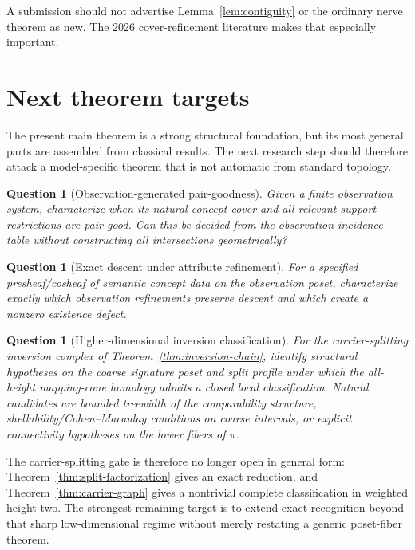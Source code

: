 \documentclass[11pt]{article}
\newtheorem{question}[theorem]{Question}
\begin{document}
A submission should not advertise Lemma~\ref{lem:contiguity} or the ordinary nerve theorem as new.  The 2026 cover-refinement literature makes that especially important.

\section{Next theorem targets}

The present main theorem is a strong structural foundation, but its most general parts are assembled from classical results.  The next research step should therefore attack a model-specific theorem that is not automatic from standard topology.

\begin{question}[Observation-generated pair-goodness]
Given a finite observation system, characterize when its natural concept cover and all relevant support restrictions are pair-good.  Can this be decided from the observation-incidence table without constructing all intersections geometrically?
\end{question}

\begin{question}[Exact descent under attribute refinement]
For a specified presheaf/cosheaf of semantic concept data on the observation poset, characterize exactly which observation refinements preserve descent and which create a nonzero existence defect.
\end{question}

\begin{question}[Higher-dimensional inversion classification]
For the carrier-splitting inversion complex of Theorem~\ref{thm:inversion-chain}, identify structural hypotheses on the coarse signature poset and split profile under which the all-height mapping-cone homology admits a closed local classification.  Natural candidates are bounded treewidth of the comparability structure, shellability/Cohen--Macaulay conditions on coarse intervals, or explicit connectivity hypotheses on the lower fibers of $\pi$.
\end{question}

The carrier-splitting gate is therefore no longer open in general form: Theorem~\ref{thm:split-factorization} gives an exact reduction, and Theorem~\ref{thm:carrier-graph} gives a nontrivial complete classification in weighted height two.  The strongest remaining target is to extend exact recognition beyond that sharp low-dimensional regime without merely restating a generic poset-fiber theorem.
\end{document}
